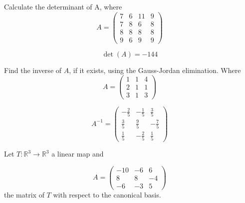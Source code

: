 \begin{questions}

\question Calculate the determinant of A, where
$$
A=\left(\begin{array}{rrrr}
7 & 6 & 11 & 9 \\
7 & 8 & 6 & 8 \\
8 & 8 & 8 & 8 \\
9 & 6 & 9 & 9
\end{array}\right)
$$

\begin{solution}
$$\det(A)=-144$$
\end{solution}

\question Find the inverse of $A$, if it exists, using the Gauss-Jordan elimination. Where
$$
A=\left(\begin{array}{rrr}
1 & 1 & 4 \\
2 & 1 & 1 \\
3 & 1 & 3
\end{array}\right)
$$

\begin{solution}
$$A^{-1}=\left(\begin{array}{rrr}
-\frac{2}{5} & -\frac{1}{5} & \frac{3}{5} \\
\frac{3}{5} & \frac{9}{5} & -\frac{7}{5} \\
\frac{1}{5} & -\frac{2}{5} & \frac{1}{5}
\end{array}\right)$$
\end{solution}

\question Let $T:\mathbb{R}^3\rightarrow\mathbb{R}^3$  a linear map and
 
$$
A=\left(\begin{array}{rrr}
-10 & -6 & 6 \\
8 & 8 & -4 \\
-6 & -3 & 5
\end{array}\right)
$$
the matrix of $T$ with respect to the canonical basis.
\end{questions}
